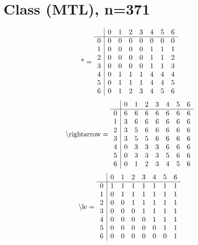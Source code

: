 \documentclass[11pt]{article}
\begin{document}
\section{Class (MTL), n=371}
\[\text{*} = 
\begin{array}{r | r r r r r r r}
 & 0 & 1 & 2 & 3 & 4 & 5 & 6 \\ \hline
0 & 0 & 0 & 0 & 0 & 0 & 0 & 0 \\
1 & 0 & 0 & 0 & 0 & 1 & 1 & 1 \\
2 & 0 & 0 & 0 & 0 & 1 & 1 & 2 \\
3 & 0 & 0 & 0 & 0 & 1 & 1 & 3 \\
4 & 0 & 1 & 1 & 1 & 4 & 4 & 4 \\
5 & 0 & 1 & 1 & 1 & 4 & 4 & 5 \\
6 & 0 & 1 & 2 & 3 & 4 & 5 & 6 \\
\end{array}
\]
\[\text{\textbackslash rightarrow} = 
\begin{array}{r | r r r r r r r}
 & 0 & 1 & 2 & 3 & 4 & 5 & 6 \\ \hline
0 & 6 & 6 & 6 & 6 & 6 & 6 & 6 \\
1 & 3 & 6 & 6 & 6 & 6 & 6 & 6 \\
2 & 3 & 5 & 6 & 6 & 6 & 6 & 6 \\
3 & 3 & 5 & 5 & 6 & 6 & 6 & 6 \\
4 & 0 & 3 & 3 & 3 & 6 & 6 & 6 \\
5 & 0 & 3 & 3 & 3 & 5 & 6 & 6 \\
6 & 0 & 1 & 2 & 3 & 4 & 5 & 6 \\
\end{array}
\]
\[\text{\textbackslash le} = 
\begin{array}{r | r r r r r r r}
 & 0 & 1 & 2 & 3 & 4 & 5 & 6 \\ \hline
0 & 1 & 1 & 1 & 1 & 1 & 1 & 1 \\
1 & 0 & 1 & 1 & 1 & 1 & 1 & 1 \\
2 & 0 & 0 & 1 & 1 & 1 & 1 & 1 \\
3 & 0 & 0 & 0 & 1 & 1 & 1 & 1 \\
4 & 0 & 0 & 0 & 0 & 1 & 1 & 1 \\
5 & 0 & 0 & 0 & 0 & 0 & 1 & 1 \\
6 & 0 & 0 & 0 & 0 & 0 & 0 & 1 \\
\end{array}
\]
\end{document}
